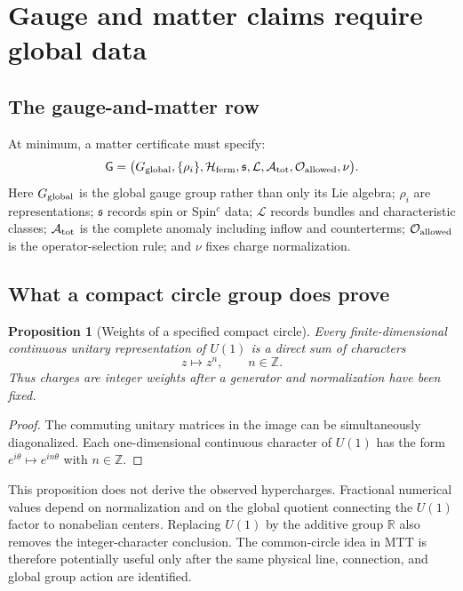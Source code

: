 \documentclass[11pt]{article}
\newtheorem{proposition}[theorem]{Proposition}
\theoremstyle{definition}
\theoremstyle{remark}
\newcommand{\R}{\mathbb{R}}
\newcommand{\axis}[1]{\mathsf{#1}}
\begin{document}
\section{Gauge and matter claims require global data}
\label{sec:matter}

\subsection{The gauge-and-matter row}

At minimum, a matter certificate must specify:
\[
 \axis{G}
 =
 \bigl(
 G_{\rm global},\{\rho_i\},\mathcal H_{\rm ferm},
 \mathfrak s,\mathcal L,\mathcal A_{\rm tot},
 \mathcal O_{\rm allowed},\nu
 \bigr).
\]
Here \(G_{\rm global}\) is the global gauge group rather than only its Lie
algebra; \(\rho_i\) are representations; \(\mathfrak s\) records spin or
Spin\(^{c}\) data; \(\mathcal L\) records bundles and characteristic classes;
\(\mathcal A_{\rm tot}\) is the complete anomaly including inflow and
counterterms; \(\mathcal O_{\rm allowed}\) is the operator-selection rule; and
\(\nu\) fixes charge normalization.

\subsection{What a compact circle group does prove}

\begin{proposition}[Weights of a specified compact circle]
\label{prop:u1-weights}
Every finite-dimensional continuous unitary representation of \(U(1)\) is a
direct sum of characters
\[
 z\longmapsto z^n,
 \qquad n\in\mathbb Z.
\]
Thus charges are integer weights after a generator and normalization have been
fixed.
\end{proposition}

\begin{proof}
The commuting unitary matrices in the image can be simultaneously
diagonalized. Each one-dimensional continuous character of \(U(1)\) has the
form \(e^{i\theta}\mapsto e^{in\theta}\) with \(n\in\mathbb Z\).
\end{proof}

This proposition does not derive the observed hypercharges. Fractional
numerical values depend on normalization and on the global quotient connecting
the \(U(1)\) factor to nonabelian centers. Replacing \(U(1)\) by the additive
group \(\R\) also removes the integer-character conclusion. The common-circle
idea in MTT is therefore potentially useful only after the same physical line,
connection, and global group action are identified.
\end{document}
